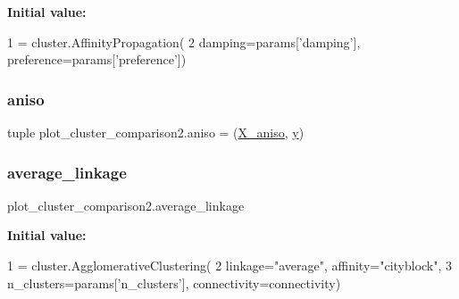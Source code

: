 {\bfseries Initial value\+:}
\begin{DoxyCode}
1 =  cluster.AffinityPropagation(
2         damping=params[\textcolor{stringliteral}{'damping'}], preference=params[\textcolor{stringliteral}{'preference'}])
\end{DoxyCode}
\mbox{\label{namespaceplot__cluster__comparison2_ac4bc843517d4ae9feb9a569a8bd95b3a}} 
\subsubsection{\texorpdfstring{aniso}{aniso}}
{\footnotesize\ttfamily tuple plot\+\_\+cluster\+\_\+comparison2.\+aniso = (\hyperlink{namespaceplot__cluster__comparison2_a7014448168271bf2f33b427d139fcc4f}{X\+\_\+aniso}, \hyperlink{namespaceplot__cluster__comparison2_afec14e7f171aedf7f79b22b85f0c60a1}{y})}

\mbox{\label{namespaceplot__cluster__comparison2_af43e1bcde2c70119e218519941f5ddbc}} 
\subsubsection{\texorpdfstring{average\+\_\+linkage}{average\_linkage}}
{\footnotesize\ttfamily plot\+\_\+cluster\+\_\+comparison2.\+average\+\_\+linkage}

{\bfseries Initial value\+:}
\begin{DoxyCode}
1 =  cluster.AgglomerativeClustering(
2         linkage=\textcolor{stringliteral}{"average"}, affinity=\textcolor{stringliteral}{"cityblock"},
3         n\_clusters=params[\textcolor{stringliteral}{'n\_clusters'}], connectivity=connectivity)
\end{DoxyCode}
\mbox{\label{namespaceplot__cluster__comparison2_ab2526583a76a661571cb08639d3b4125}} 
